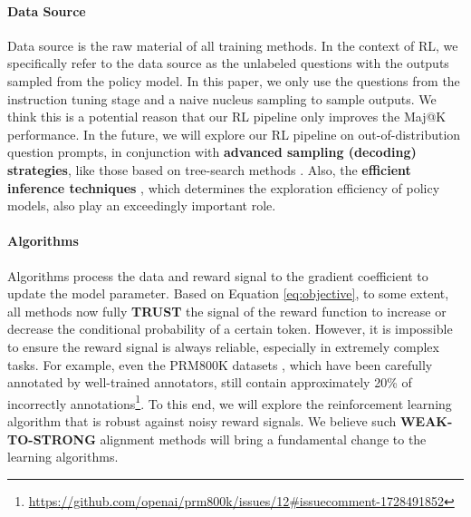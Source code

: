 \paragraph{Data Source} Data source is the raw material of all training methods.
In the context of RL, we specifically refer to the data source as the unlabeled questions with the outputs sampled from the policy model. In this paper, we only use the questions from the instruction tuning stage and a naive nucleus sampling to sample outputs. We think this is a potential reason that 
our RL pipeline only improves the Maj@K performance. In the future, we will explore our RL pipeline on out-of-distribution question prompts, in conjunction with \textbf{advanced sampling (decoding) strategies}, like those based on tree-search methods \citep{yao2023tree}.
Also, the  \textbf{efficient inference techniques} \citep{xia-etal-2023-speculative,leviathan2023fast,kwon2023efficient,xia2024unlocking}, which determines the exploration efficiency of policy models, also play an exceedingly important role.



\paragraph{Algorithms} Algorithms process the data and reward signal to the gradient coefficient to update the model parameter. 
Based on Equation \ref{eq:objective}, to some extent, all methods now fully \textbf{TRUST} the signal of the reward function to increase or decrease the conditional probability of a certain token.
However, it is impossible to ensure the reward signal is always reliable, especially in extremely complex tasks. For example, even the PRM800K datasets \citep{lightman2023let}, which have been carefully annotated by well-trained annotators, still contain approximately 20\% of incorrectly annotations\footnote{\url{https://github.com/openai/prm800k/issues/12\#issuecomment-1728491852}}. To this end, we will explore the reinforcement learning algorithm that is robust against noisy reward signals.  We believe such \textbf{WEAK-TO-STRONG} \citep{burns2023weak} alignment methods will bring a fundamental change to the learning algorithms.

